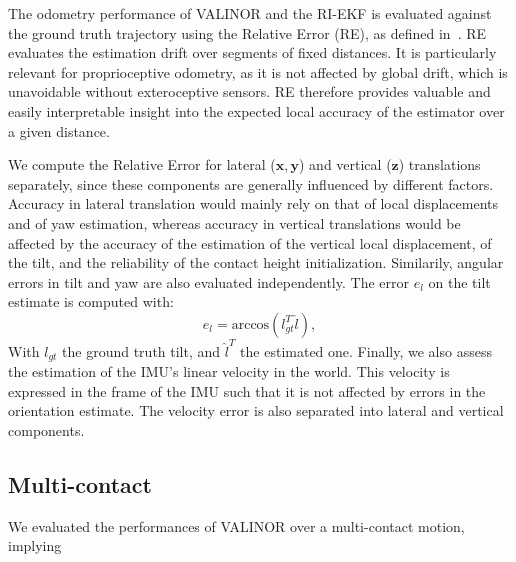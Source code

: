 \documentclass{IJCAS}
\begin{document}
The odometry performance of VALINOR and the RI-EKF is evaluated against the ground truth trajectory using the Relative Error (RE), as defined in~\cite{Zhang2018QuantitativeTrajectoryEvaluation}. RE evaluates the estimation drift over segments of fixed distances. It is particularly relevant for proprioceptive odometry, as it is not affected by global drift, which is unavoidable without exteroceptive sensors. RE therefore provides valuable and easily interpretable insight into the expected local accuracy of the estimator over a given distance.

We compute the Relative Error for lateral ($\boldsymbol{x}, \boldsymbol{y}$) and vertical ($\boldsymbol{z}$) translations separately, since these components are generally influenced by different factors. Accuracy in lateral translation would mainly rely on that of local displacements and of yaw estimation, whereas accuracy in vertical translations would be affected by the accuracy of the estimation of the vertical local displacement, of the tilt, and the reliability of the contact height initialization. Similarily, angular errors in tilt and yaw are also evaluated independently.
The error $e_{l}$ on the tilt estimate is computed with:
\begin{equation}
    e_{l} = \text{arccos}\left(l_{gt}^{T} \hat{l} \right),
\end{equation}
With $l_{gt}$ the ground truth tilt, and $\hat{l}^{T}$ the estimated one.
Finally, we also assess the estimation of the IMU's linear velocity in the world. This velocity is expressed in the frame of the IMU such that it is not affected by errors in the orientation estimate. The velocity error is also separated into lateral and vertical components.

\subsection{Multi-contact}

We evaluated the performances of VALINOR over a multi-contact motion, implying 
\end{document}
